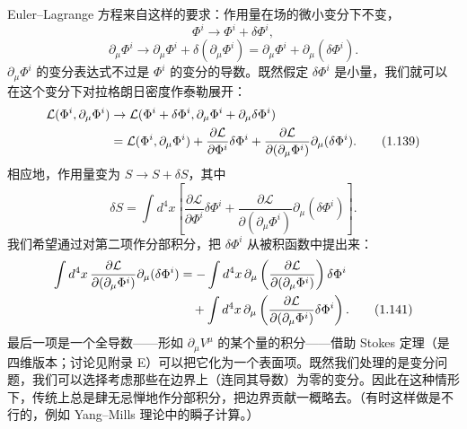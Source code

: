 Euler--Lagrange 方程来自这样的要求：作用量在场的微小变分下不变，
\begin{equation*}
\Phi^{i} \rightarrow \Phi^{i} + \delta\Phi^{i},
\tag{1.137}
\end{equation*}
\begin{equation*}
\partial_{\mu}\Phi^{i} \rightarrow \partial_{\mu}\Phi^{i} + \delta(\partial_{\mu}\Phi^{i}) = \partial_{\mu}\Phi^{i} + \partial_{\mu}(\delta\Phi^{i}).
\tag{1.138}
\end{equation*}
$\partial_{\mu}\Phi^{i}$ 的变分表达式不过是 $\Phi^{i}$ 的变分的导数。既然假定 $\delta\Phi^{i}$ 是小量，我们就可以在这个变分下对拉格朗日密度作泰勒展开：
\begin{align*}
\mathcal{L}(\Phi^{i}, \partial_{\mu}\Phi^{i}) &\rightarrow \mathcal{L}(\Phi^{i} + \delta\Phi^{i}, \partial_{\mu}\Phi^{i} + \partial_{\mu}\delta\Phi^{i})\notag\\
&= \mathcal{L}(\Phi^{i}, \partial_{\mu}\Phi^{i}) + \frac{\partial\mathcal{L}}{\partial\Phi^{i}}\delta\Phi^{i} + \frac{\partial\mathcal{L}}{\partial(\partial_{\mu}\Phi^{i})}\partial_{\mu}(\delta\Phi^{i}).
\tag{1.139}
\end{align*}
相应地，作用量变为 $S\rightarrow S+\delta S$，其中
\begin{equation*}
\delta S = \int d^{4}x\left[\frac{\partial\mathcal{L}}{\partial\Phi^{i}}\delta\Phi^{i} + \frac{\partial\mathcal{L}}{\partial(\partial_{\mu}\Phi^{i})}\partial_{\mu}(\delta\Phi^{i})\right].
\tag{1.140}
\end{equation*}
我们希望通过对第二项作分部积分，把 $\delta\Phi^{i}$ 从被积函数中提出来：
\begin{align*}
\int d^{4}x\, \frac{\partial\mathcal{L}}{\partial(\partial_{\mu}\Phi^{i})}\partial_{\mu}(\delta\Phi^{i}) &= -\int d^{4}x\, \partial_{\mu}\left(\frac{\partial\mathcal{L}}{\partial(\partial_{\mu}\Phi^{i})}\right)\delta\Phi^{i}\notag\\
&\quad + \int d^{4}x\, \partial_{\mu}\left(\frac{\partial\mathcal{L}}{\partial(\partial_{\mu}\Phi^{i})}\delta\Phi^{i}\right).
\tag{1.141}
\end{align*}
最后一项是一个全导数——形如 $\partial_{\mu}V^{\mu}$ 的某个量的积分——借助 Stokes 定理（是四维版本；讨论见附录 E）可以把它化为一个表面项。既然我们处理的是变分问题，我们可以选择考虑那些在边界上（连同其导数）为零的变分。因此在这种情形下，传统上总是肆无忌惮地作分部积分，把边界贡献一概略去。（有时这样做是不行的，例如 Yang--Mills 理论中的瞬子计算。）

